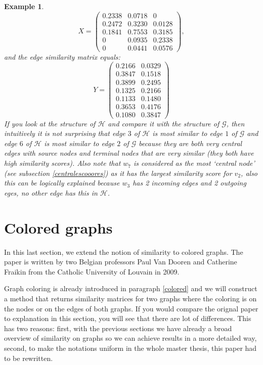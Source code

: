 \documentclass[a4paper,11pt]{report}
\newtheorem{example}[theorem]{Example}
\newcommand{\graf}{\mathscr{G}}
\newcommand{\grafeen}{\mathscr{H}}
\begin{document}
\begin{example}
$$X = \begin{pmatrix}
0.2338  &  0.0718  &       0\\
0.2472   & 0.3230  &  0.0128\\
0.1841   &  0.7553 &   0.3185\\
0  &  0.0935  &  0.2338\\
0   & 0.0441 &   0.0576
\end{pmatrix},$$
 and the edge similarity matrix equals:
 $$ Y = \begin{pmatrix}
0.2166 & 0.0329\\
0.3847 & 0.1518\\
0.3899 & 0.2495\\
0.1325 & 0.2166\\
0.1133 & 0.1480\\
0.3653 & 0.4176\\
0.1080 & 0.3847
\end{pmatrix}$$
If you look at the structure of $\grafeen$ and compare it with the structure of $\graf$, then 
intuitively it is not surprising that edge $3$ of $\grafeen$ is most similar to edge $1$ of 
$\graf$ and edge $6$ of $\grafeen$ is most similar to edge $2$ of $\graf$ because they are both very
central edges with source nodes and terminal nodes that are very similar (they both have high similarity scores). 
Also note that $w_7$ is considered as the most `central node' (see subsection \ref{centralescooores}) as it has the 
largest similarity score for $v_2$, also this can be logically explained because $w_3$ has 2 incoming edges and 2 outgoing
eges, no other edge has this in $\grafeen$. \end{example}
 


\section{Colored graphs}
In this last section, we extend the notion of similarity to colored graphs. The 
paper \cite{vandoren} is written by two Belgian professors Paul Van Dooren and 
Catherine Fraikin from the Catholic University of 
Louvain in 2009.

Graph coloring is already introduced in paragraph \ref{colored} and we will 
construct a method that returns similarity matrices for two graphs where the coloring is on the nodes or 
on the edges of both graphs. If you would compare the orignal paper to 
explanation in this section, you will see that there are lot of differences. 
This has two reasons: first, with the previous sections we have already a broad overview of 
similarity on graphs so we can achieve results in a more detailed way, second, to make 
the notations uniform in the whole master thesis, this paper had to be 
rewritten.
\end{document}
